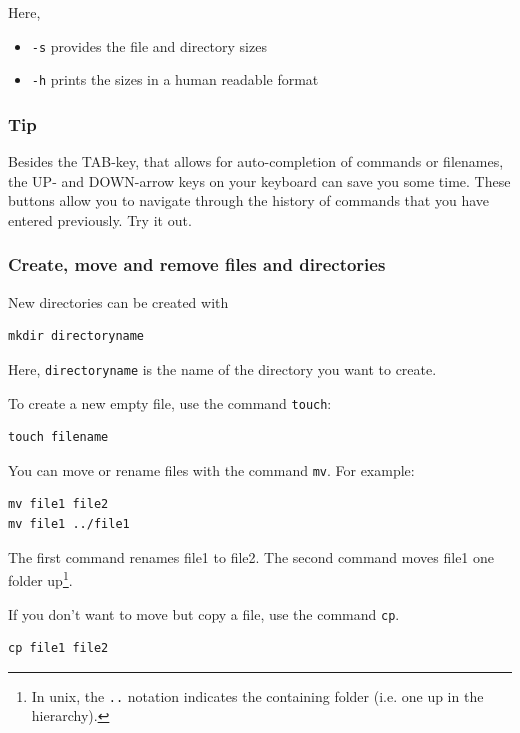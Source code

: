 \documentclass[11pt]{article}
\begin{document}
Here, 
\begin{itemize}
\item \texttt{-s} provides the file and directory sizes
\item \texttt{-h} prints the sizes in a human readable format
\end{itemize}

\subsubsection{Tip}
\label{sec:orgheadline7}
Besides the TAB-key, that allows for auto-completion of commands or
filenames, the UP- and DOWN-arrow keys on your keyboard can save you
some time. These buttons allow you to navigate through the history of
commands that you have entered previously.  Try it out.

\subsubsection{Create, move and remove files and directories}
\label{sec:orgheadline8}
New directories can be created with

\begin{verbatim}
mkdir directoryname
\end{verbatim}
Here, \texttt{directoryname} is the name of the directory you want to create.

To create a new empty file, use the command \texttt{touch}:

\begin{verbatim}
touch filename
\end{verbatim}

You can move or rename files with the command \texttt{mv}. For example:

\begin{verbatim}
mv file1 file2
mv file1 ../file1
\end{verbatim}

The first command renames file1 to file2. The second command moves
file1 one folder up\footnote{In unix, the \texttt{..} notation indicates the containing folder
(i.e. one up in the hierarchy).}.

If you don't want to move but copy a file, use the command \texttt{cp}.

\begin{verbatim}
cp file1 file2
\end{verbatim}
\end{document}
